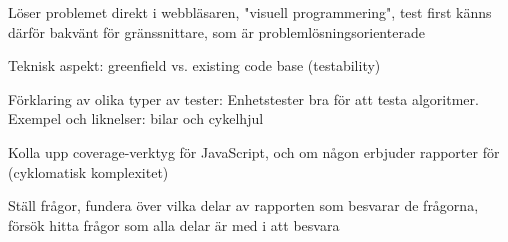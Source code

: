 \documentclass[11pt]{article}
\begin{document}
Löser problemet direkt i webbläsaren, "visuell programmering", test first känns därför bakvänt för gränssnittare, som är problemlösningsorienterade

Teknisk aspekt: greenfield vs. existing code base (testability)

Förklaring av olika typer av tester: Enhetstester bra för att testa algoritmer. Exempel och liknelser: bilar och cykelhjul

Kolla upp coverage-verktyg för JavaScript, och om någon erbjuder rapporter för (cyklomatisk komplexitet)

Ställ frågor, fundera över vilka delar av rapporten som besvarar de frågorna, försök hitta frågor som alla delar är med i att besvara

\printbibliography
\end{document}
